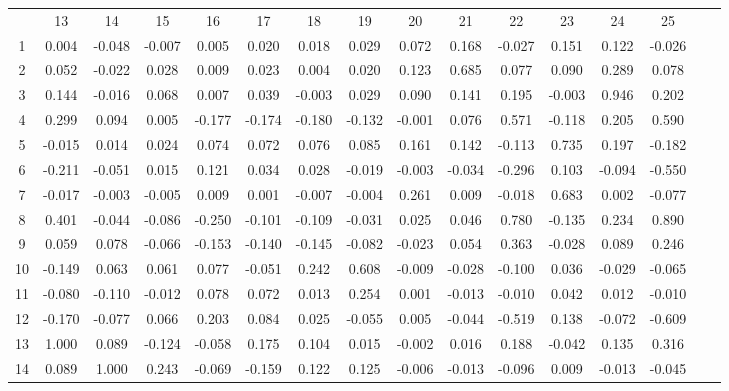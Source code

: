 \documentclass[ %
                    author={Sam Phippen},
                supervisor={Dr. Rafal Bogacz},
                     title={Real time voice activity detectors in noisy personal computing environments},
                  subtitle={},
                    degree={MEng},
                      year={2012} ]{thesis}
\begin{document}
\begin{table}

    \begin{tabular}{cccccccccccccccc}
           & 13     & 14     & 15     & 16     & 17     & 18     & 19     & 20     & 21     & 22     & 23     & 24     & 25 \\
        1  & 0.004  & -0.048 & -0.007 & 0.005  & 0.020  & 0.018  & 0.029  & 0.072  & 0.168  & -0.027 & 0.151  & 0.122  & -0.026 \\
        2  & 0.052  & -0.022 & 0.028  & 0.009  & 0.023  & 0.004  & 0.020  & 0.123  & 0.685  & 0.077  & 0.090  & 0.289  & 0.078 \\
        3  & 0.144  & -0.016 & 0.068  & 0.007  & 0.039  & -0.003 & 0.029  & 0.090  & 0.141  & 0.195  & -0.003 & 0.946  & 0.202 \\
        4  & 0.299  & 0.094  & 0.005  & -0.177 & -0.174 & -0.180 & -0.132 & -0.001 & 0.076  & 0.571  & -0.118 & 0.205  & 0.590 \\
        5  & -0.015 & 0.014  & 0.024  & 0.074  & 0.072  & 0.076  & 0.085  & 0.161  & 0.142  & -0.113 & 0.735  & 0.197  & -0.182 \\
        6  & -0.211 & -0.051 & 0.015  & 0.121  & 0.034  & 0.028  & -0.019 & -0.003 & -0.034 & -0.296 & 0.103  & -0.094 & -0.550 \\
        7  & -0.017 & -0.003 & -0.005 & 0.009  & 0.001  & -0.007 & -0.004 & 0.261  & 0.009  & -0.018 & 0.683  & 0.002  & -0.077 \\
        8  & 0.401  & -0.044 & -0.086 & -0.250 & -0.101 & -0.109 & -0.031 & 0.025  & 0.046  & 0.780  & -0.135 & 0.234  & 0.890 \\
        9  & 0.059  & 0.078  & -0.066 & -0.153 & -0.140 & -0.145 & -0.082 & -0.023 & 0.054  & 0.363  & -0.028 & 0.089  & 0.246 \\
        10 & -0.149 & 0.063  & 0.061  & 0.077  & -0.051 & 0.242  & 0.608  & -0.009 & -0.028 & -0.100 & 0.036  & -0.029 & -0.065 \\
        11 & -0.080 & -0.110 & -0.012 & 0.078  & 0.072  & 0.013  & 0.254  & 0.001  & -0.013 & -0.010 & 0.042  & 0.012  & -0.010 \\
        12 & -0.170 & -0.077 & 0.066  & 0.203  & 0.084  & 0.025  & -0.055 & 0.005  & -0.044 & -0.519 & 0.138  & -0.072 & -0.609 \\
        13 & 1.000  & 0.089  & -0.124 & -0.058 & 0.175  & 0.104  & 0.015  & -0.002 & 0.016  & 0.188  & -0.042 & 0.135  & 0.316 \\
        14 & 0.089  & 1.000  & 0.243  & -0.069 & -0.159 & 0.122  & 0.125  & -0.006 & -0.013 & -0.096 & 0.009  & -0.013 & -0.045 \\

\end{tabular}
\end{table}
\end{document}
